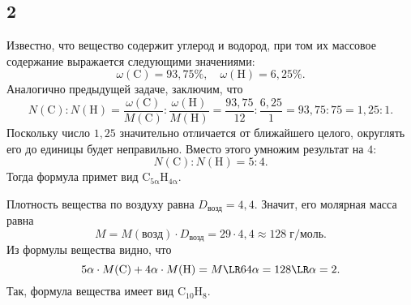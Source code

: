 \subsection{2}

Известно, что вещество содержит углерод и водород, при том их массовое содержание выражается следующими значениями:
\[
\omega(\mathrm{C})=93{,}75\%,\quad\omega(\mathrm{H})=6{,}25\%.
\]
Аналогично предыдущей задаче, заключим, что
\[
N(\mathrm{C}):N(\mathrm{H})=\frac{\omega(\mathrm{C})}{M(\mathrm{C})}:\frac{\omega(\mathrm{H})}{M(\mathrm{H})}=\frac{93{,}75}{12}:\frac{6{,}25}{1}=93{,}75:75=1{,}25:1.
\]
Поскольку число $1{,}25$ значительно отличается от ближайшего целого, округлять его до единицы будет неправильно. Вместо этого умножим результат на $4$:
\[
N(\mathrm{C}):N(\mathrm{H})=5:4.
\]
Тогда формула примет вид $\mathrm{C_{5\alpha}H_{4\alpha}}$.

Плотность вещества по воздуху равна $D_\text{возд}=4{,}4$. Значит, его молярная масса равна
\[
M=M(\text{возд})\cdot D_\text{возд}=29\cdot4{,}4\approx128\;\text{г/моль}.
\]
Из формулы вещества видно, что
\[
5\alpha\cdot M(\mathrm{C})+4\alpha\cdot M(\mathrm{H})=M\LR64\alpha=128\LR\alpha=2.
\]
Так, формула вещества имеет вид $\mathrm{C_{10}H_8}$.